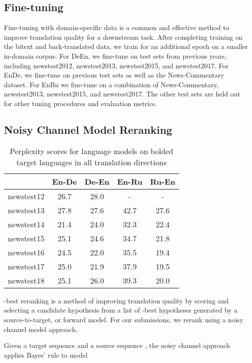 \documentclass[11pt,a4paper]{article}
\newcommand{\entode}{EnDe}
\newcommand{\detoen}{DeEn}
\newcommand{\enbiru}{EnRu}
\begin{document}
\subsection{Fine-tuning}
Fine-tuning with domain-specific data is a common and effective method to improve translation quality for a downstream task. 
After completing training on the bitext and back-translated data, we train for an additional epoch on a smaller in-domain corpus.
For \detoen{}, we fine-tune on test sets from previous years, including newstest2012, newstest2013, newstest2015, and newstest2017.
For \entode{}, we fine-tune on previous test sets as well as the News-Commentary dataset.
For \enbiru{} we fine-tune on a combination of News-Commentary, newstest2013, newstest2015, and newstest2017. 
The other test sets are held out for other tuning procedures and evaluation metrics.

\subsection{Noisy Channel Model Reranking}

\begin{table}[t]
\centering
\begin{tabular}{lcccc}
\toprule
& En-\textbf{De} & De-\textbf{En} & En-\textbf{Ru} & Ru-\textbf{En} \\ \midrule
newstest12 & 26.7 & 28.0 & - & - \\
newstest13 & 27.8 & 27.6 & 42.7 & 27.6 \\
newstest14 & 21.4 & 24.0 & 32.3 & 22.4 \\
newstest15 & 25.1 & 24.6 & 34.7 & 21.8 \\
newstest16 & 24.5 & 22.0 & 35.5 & 19.4 \\
newstest17 & 25.0 & 21.9 & 37.9 & 19.5 \\
newstest18 & 25.1 & 26.0 & 39.3 & 20.0 \\
\bottomrule
\end{tabular}
\caption{Perplexity scores for language models on bolded target languages in all translation directions}
\label{tab:lm_newstest}
\end{table}

-best reranking is a method of improving translation quality by scoring and selecting a candidate hypothesis from a list of -best hypotheses generated by a source-to-target, or forward model.
For our submissions, we rerank using a noisy channel model approach.

Given a target sequence  and a source sequence , the noisy channel approach applies Bayes' rule to model 
\end{document}
